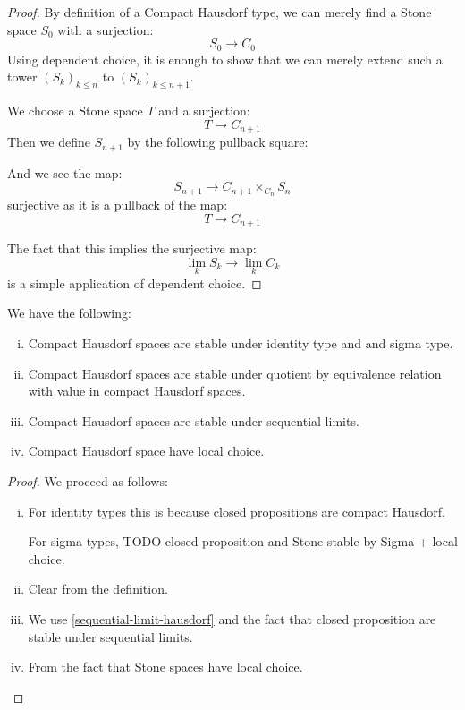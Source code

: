 \begin{proof}
By definition of a Compact Hausdorf type, we can merely find a Stone space $S_0$ with a surjection:
\[S_0\to C_0\]
Using dependent choice, it is enough to show that we can merely extend such a tower $(S_k)_{k\leq n}$ to $(S_k)_{k\leq n+1}$.

We choose a Stone space $T$ and a surjection:
\[T \to C_{n+1} \]
Then we define $S_{n+1}$ by the following pullback square:
\begin{center}
\end{center}
And we see the map:
\[S_{n+1} \to C_{n+1}\times_{C_n} S_n\] 
surjective as it is a pullback of the map:
\[T\to C_{n+1}\]

The fact that this implies the surjective map:
\[\lim_kS_k \to \lim_k C_k\]
is a simple application of dependent choice.
\end{proof}

\begin{theorem}
We have the following:
\begin{enumerate}[(i)]
\item Compact Hausdorf spaces are stable under identity type and and sigma type.
\item Compact Hausdorf spaces are stable under quotient by equivalence relation with value in compact Hausdorf spaces.
\item Compact Hausdorf spaces are stable under sequential limits.
\item Compact Hausdorf space have local choice.
\end{enumerate}
\end{theorem}

\begin{proof}
We proceed as follows:
\begin{enumerate}[(i)]
\item For identity types this is because closed propositions are compact Hausdorf.

For sigma types, TODO closed proposition and Stone stable by Sigma + local choice.

\item Clear from the definition.

\item We use \cref{sequential-limit-hausdorf} and the fact that closed proposition are stable under sequential limits.

\item From the fact that Stone spaces have local choice.
\end{enumerate}
\end{proof}
